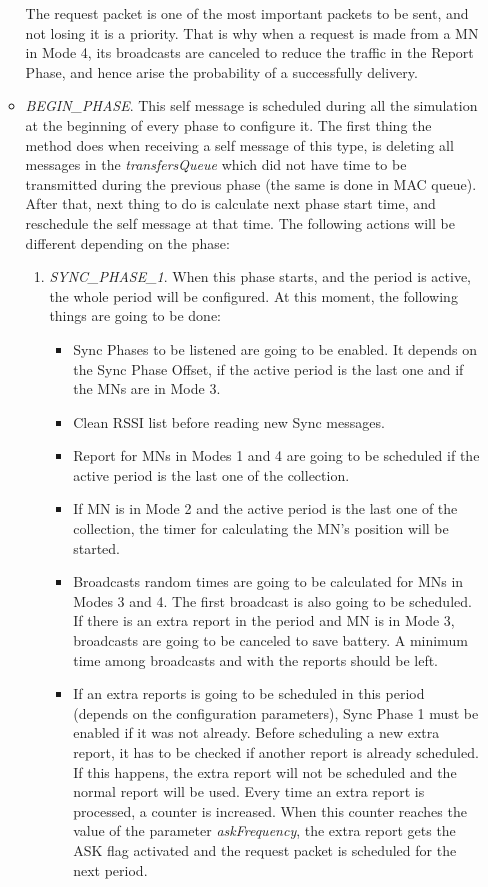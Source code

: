 \begin{itemize}
\begin{itemize}
  The request packet is one of the most important packets to be sent, and not losing it is a priority. That is why when a request is made from a 
  \ac{MN} in Mode 4, its broadcasts are canceled to reduce the traffic in the Report Phase, and hence arise the probability of a successfully 
  delivery.

  \item \textit{BEGIN\_PHASE}. This self message is scheduled during all the simulation at the beginning of every phase to configure it. The 
  first thing the method does when receiving a self message of this type, is deleting all messages in the \textit{transfersQueue} which did not 
  have time to be transmitted during the previous phase (the same is done in \ac{MAC} queue). After that, next thing to do is calculate next phase 
  start time, and reschedule the self message at that time. The following actions will be different depending on the phase:
  \begin{enumerate}
    \item \textit{SYNC\_PHASE\_1}. When this phase starts, and the period is active, the whole period will be configured. At this moment, the 
    following things are going to be done:
    \begin{itemize}
      \item Sync Phases to be listened are going to be enabled. It depends on the Sync Phase Offset, if the active period is the last one and
      if the \acp{MN} are in Mode 3.
      \item Clean \ac{RSSI} list before reading new Sync messages.
      \item Report for \acp{MN} in Modes 1 and 4 are going to be scheduled if the active period is the last one of the collection.
      \item If \ac{MN} is in Mode 2 and the active period is the last one of the collection, the timer for calculating the \ac{MN}'s position will 
      be started.
      \item Broadcasts random times are going to be calculated for \acp{MN} in Modes 3 and 4. The first broadcast is also going to be scheduled. 
      If there is an extra report in the period and \ac{MN} is in Mode 3, broadcasts are going to be canceled to save battery. A minimum time among
      broadcasts and with the reports should be left.
      \item If an extra reports is going to be scheduled in this period (depends on the configuration parameters), Sync Phase 1 must be enabled if it
      was not already. Before scheduling a new extra report, it has to be checked if another report is already scheduled. If this happens, the extra
      report will not be scheduled and the normal report will be used. Every time an extra report is processed, a counter is increased. When this
      counter reaches the value of the parameter \textit{askFrequency}, the extra report gets the ASK flag activated and the request packet is 
      scheduled for the next period.
    \end{itemize}





\end{enumerate}
\end{itemize}
\end{itemize}
